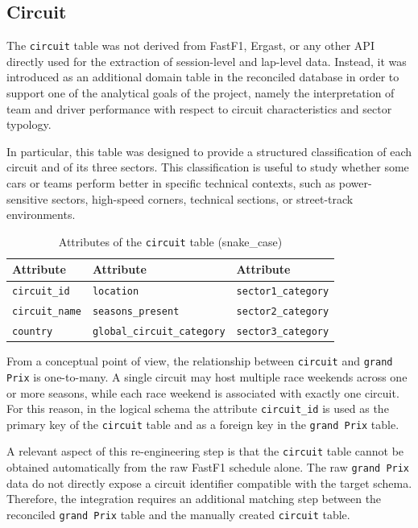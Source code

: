 \documentclass[12pt,a4paper]{article}
\begin{document}
	
	\subsection{Circuit}
	
	The \texttt{circuit} table was not derived from FastF1, Ergast, or any other API directly used for the extraction of session-level and lap-level data.
	Instead, it was introduced as an additional domain table in the reconciled database in order to support one of the analytical goals of the project, namely the interpretation of team and driver performance with respect to circuit characteristics and sector typology.
	
	In particular, this table was designed to provide a structured classification of each circuit and of its three sectors.
	This classification is useful to study whether some cars or teams perform better in specific technical contexts, such as power-sensitive sectors, high-speed corners, technical sections, or street-track environments.


	\begin{table}[H]
		\centering
		\caption{Attributes of the \texttt{circuit} table (snake\_case)}
		\renewcommand{\arraystretch}{1.15}
		\begin{tabularx}{\textwidth}{>{\raggedright\arraybackslash}X >{\raggedright\arraybackslash}X >{\raggedright\arraybackslash}X}
			\toprule
			\textbf{Attribute} & \textbf{Attribute} & \textbf{Attribute} \\
			\midrule
			\texttt{circuit\_id} & \texttt{location} & \texttt{sector1\_category} \\
			\texttt{circuit\_name} & \texttt{seasons\_present} & \texttt{sector2\_category} \\
			\texttt{country} & \texttt{global\_circuit\_category} & \texttt{sector3\_category} \\
			\bottomrule
		\end{tabularx}
	\end{table}
	
	From a conceptual point of view, the relationship between \texttt{circuit} and \texttt{grand Prix} is one-to-many.
	A single circuit may host multiple race weekends across one or more seasons, while each race weekend is associated with exactly one circuit.
	For this reason, in the logical schema the attribute \texttt{circuit\_id} is used as the primary key of the \texttt{circuit} table and as a foreign key in the \texttt{grand Prix} table.
	
	A relevant aspect of this re-engineering step is that the \texttt{circuit} table cannot be obtained automatically from the raw FastF1 schedule alone.
	The raw \texttt{grand Prix} data do not directly expose a circuit identifier compatible with the target schema.
	Therefore, the integration requires an additional matching step between the reconciled \texttt{grand Prix} table and the manually created \texttt{circuit} table.
	
\end{document}

